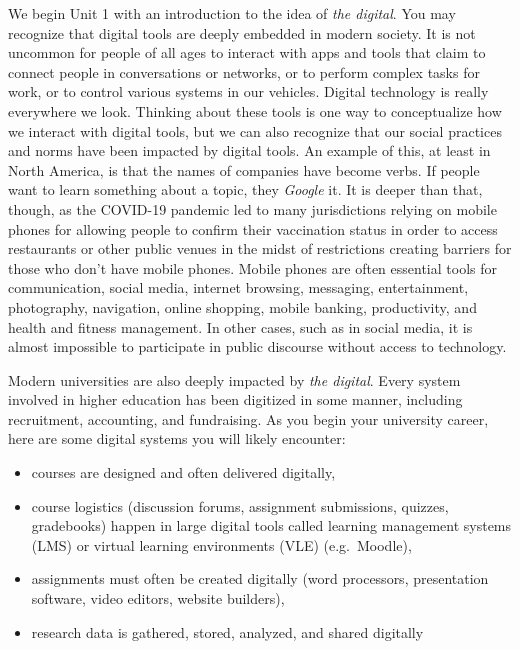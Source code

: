 \documentclass[
]{book}
\providecommand{\tightlist}{%
  \setlength{\itemsep}{0pt}\setlength{\parskip}{0pt}}
\theoremstyle{definition}
\theoremstyle{definition}
\theoremstyle{definition}
\theoremstyle{definition}
\theoremstyle{remark}
\begin{document}
We begin Unit 1 with an introduction to the idea of \emph{the digital}. You may recognize that digital tools are deeply embedded in modern society. It is not uncommon for people of all ages to interact with apps and tools that claim to connect people in conversations or networks, or to perform complex tasks for work, or to control various systems in our vehicles. Digital technology is really everywhere we look. Thinking about these tools is one way to conceptualize how we interact with digital tools, but we can also recognize that our social practices and norms have been impacted by digital tools. An example of this, at least in North America, is that the names of companies have become verbs. If people want to learn something about a topic, they \emph{Google} it. It is deeper than that, though, as the COVID-19 pandemic led to many jurisdictions relying on mobile phones for allowing people to confirm their vaccination status in order to access restaurants or other public venues in the midst of restrictions creating barriers for those who don't have mobile phones. Mobile phones are often essential tools for communication, social media, internet browsing, messaging, entertainment, photography, navigation, online shopping, mobile banking, productivity, and health and fitness management. In other cases, such as in social media, it is almost impossible to participate in public discourse without access to technology.

Modern universities are also deeply impacted by \emph{the digital}. Every system involved in higher education has been digitized in some manner, including recruitment, accounting, and fundraising. As you begin your university career, here are some digital systems you will likely encounter:

\begin{itemize}
\tightlist
\item
  courses are designed and often delivered digitally,
\item
  course logistics (discussion forums, assignment submissions, quizzes, gradebooks) happen in large digital tools called learning management systems (LMS) or virtual learning environments (VLE) (e.g.~Moodle),
\item
  assignments must often be created digitally (word processors, presentation software, video editors, website builders),
\item
  research data is gathered, stored, analyzed, and shared digitally
\end{itemize}
\end{document}
